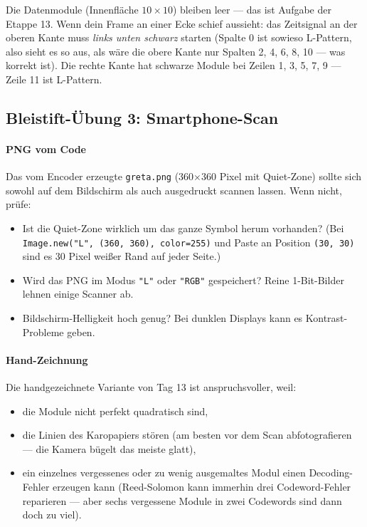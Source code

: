 Die Datenmodule (Innenfläche $10 \times 10$) bleiben leer — das
ist Aufgabe der Etappe 13. Wenn dein Frame an einer Ecke schief
aussieht: das Zeitsignal an der oberen Kante muss \emph{links unten
schwarz} starten (Spalte 0 ist sowieso L-Pattern, also sieht es so
aus, als wäre die obere Kante nur Spalten 2, 4, 6, 8, 10 — was
korrekt ist). Die rechte Kante hat schwarze Module bei Zeilen
1, 3, 5, 7, 9 — Zeile 11 ist L-Pattern.

\subsection*{Bleistift-Übung 3: Smartphone-Scan}

\paragraph{PNG vom Code} Das vom Encoder erzeugte
\texttt{greta.png} (360$\times$360 Pixel mit Quiet-Zone) sollte sich
sowohl auf dem Bildschirm als auch ausgedruckt scannen lassen.
Wenn nicht, prüfe:

\begin{itemize}
\item Ist die Quiet-Zone wirklich um das ganze Symbol herum
  vorhanden? (Bei \texttt{Image.new("L", (360, 360), color=255)}
  und Paste an Position \texttt{(30, 30)} sind es 30 Pixel
  weißer Rand auf jeder Seite.)
\item Wird das PNG im Modus \texttt{"L"} oder \texttt{"RGB"}
  gespeichert? Reine 1-Bit-Bilder lehnen einige Scanner ab.
\item Bildschirm-Helligkeit hoch genug? Bei dunklen Displays
  kann es Kontrast-Probleme geben.
\end{itemize}

\paragraph{Hand-Zeichnung} Die handgezeichnete Variante von Tag 13
ist anspruchsvoller, weil:

\begin{itemize}
\item die Module nicht perfekt quadratisch sind,
\item die Linien des Karopapiers stören (am besten vor dem Scan
  abfotografieren — die Kamera bügelt das meiste glatt),
\item ein einzelnes vergessenes oder zu wenig ausgemaltes Modul
  einen Decoding-Fehler erzeugen kann (Reed-Solomon kann immerhin
  drei Codeword-Fehler reparieren — aber sechs vergessene Module
  in zwei Codewords sind dann doch zu viel).
\end{itemize}

